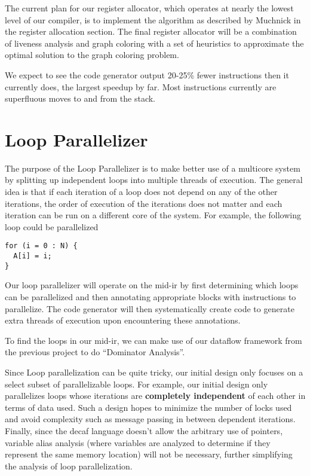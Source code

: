 \documentclass[11pt]{article}
\begin{document}
The current plan for our register allocator, which operates at nearly
the lowest level of our compiler, is to implement the
algorithm as described by Muchnick in the register allocation
section. The final register allocator will be a combination of
liveness analysis and graph coloring with a set of heuristics to
approximate the optimal solution to the graph coloring problem. 

We expect to see the code generator output 20-25\% fewer instructions
then it currently does, the largest speedup by far. Most instructions
currently are superfluous moves to and from the stack.

\section {Loop Parallelizer}
\label{sec:parallel}

The purpose of the Loop Parallelizer is to make better use of a multicore
system by splitting up independent loops into multiple threads of
execution. The general idea is that if each iteration of a loop does
not depend on any of the other iterations, the order of execution of
the iterations does not matter and each iteration can be run on a
different core of the system. For example, the following loop could be
parallelized 

\begin{verbatim}
for (i = 0 : N) {
  A[i] = i; 
}
\end{verbatim} 

Our loop parallelizer will operate on the mid-ir by first determining
which loops can be parallelized and then annotating appropriate blocks
with instructions to parallelize. The code generator will then
systematically create code to generate extra threads of execution upon encountering
these annotations.

To find the loops in our mid-ir, we can make use of our dataflow
framework from the previous project to do ``Dominator Analysis''. 

Since Loop parallelization can be quite tricky, our initial design
only focuses on a select subset of parallelizable loops. For example,
our initial design only parallelizes
loops whose iterations are \textbf{completely independent} of each
other in terms of data used. Such a design hopes to minimize the
number of locks used and avoid complexity such as message passing in
between dependent iterations.\\

Finally, since the decaf language doesn't allow the arbitrary use of
pointers, variable alias analysis (where variables are analyzed to
determine if they represent the same memory location) will not be
necessary, further simplifying the analysis of loop parallelization. 
\end{document}
